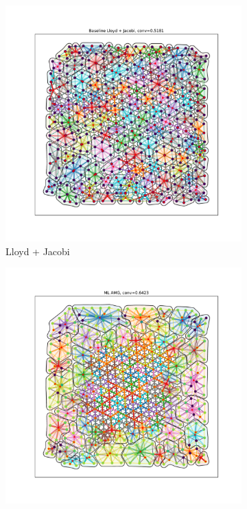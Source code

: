 \documentclass{article}
\begin{document}
\begin{figure}[h]
  \centering
  \begin{subfigure}[t]{0.32\textwidth}
    \centering
    \includegraphics[width=\textwidth, trim=80 70 70 50, clip]{grid_largest_lloyd.pdf}
    \caption{Lloyd + Jacobi}
  \end{subfigure}
  \begin{subfigure}[t]{0.32\textwidth}
    \centering
    \includegraphics[width=\textwidth, trim=80 70 70 50, clip]{grid_largest_ml.pdf}

\end{subfigure}
\end{figure}
\end{document}
